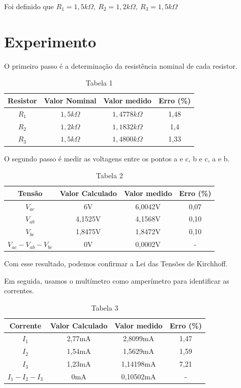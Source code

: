 \documentclass[a4 paper]{article}
\newcommand{\parag}{\hspace{30pt}}
\begin{document}
\noindent Foi definido que $R_1=1,5k\Omega,\ R_2=1,2k\Omega,\ R_3=1,5k\Omega$ 

\newpage\section{Experimento}
\parag O primeiro passo é a determinação da resistência nominal de cada resistor. 

\vspace{5pt}
\begin{table}[h]
\centering
\begin{tabular}{|c|c|c|c|}
\hline
Resistor & Valor Nominal & Valor medido & Erro (\%)\\ \hline
$R_1$ & $1,5k\Omega$ & $1,4778k\Omega$ & 1,48 \\\hline
$R_2$ & $1,2k\Omega$ & $1,1832k\Omega$ & 1,4 \\\hline
$R_3$ & $1,5k\Omega$ & $1,4800k\Omega$ & 1,33 \\\hline
\end{tabular}
\caption*{Tabela 1}
\end{table}
\vspace{15pt}

\parag O segundo passo é medir as voltagens entre os pontos a e c, b e c, a e b. \\
\vspace{5pt}
\begin{table}[h]
\centering
\begin{tabular}{|c|c|c|c|}
\hline
Tensão & Valor Calculado & Valor medido & Erro (\%)\\ \hline
$V_{ac}$ &  6V & 6,0042V & 0,07 \\\hline 
$V_{ab}$ & 4,1525V & 4,1568V & 0,10\\\hline
$V_{bc}$ & 1,8475V & 1,8472V  & 0,10\\\hline
$V_{ac}-V_{ab}-V_{bc}$ & 0V &   0,0002V & - \\\hline
\end{tabular}
\caption*{Tabela 2}
\end{table}

\vspace{15pt}
\parag Com esse resultado, podemos confirmar a Lei das Tensões de Kirchhoff.

\parag Em seguida, usamos o multímetro como amperímetro para identificar as correntes.
\vspace{5pt}
\begin{table}[h]
\centering
\begin{tabular}{|c|c|c|c|}
\hline
Corrente & Valor Calculado & Valor medido & Erro (\%)\\ \hline
$I_1$ & 2,77mA & 2,8099mA & 1,47 \\\hline
$I_2$ & 1,54mA & 1,5629mA & 1,59\\\hline
$I_3$ & 1,23mA & 1,14198mA & 7,21\\\hline
$I_1-I_2-I_3$ & 0mA & 0,10502mA  & - \\\hline
\end{tabular}
\caption*{Tabela 3}
\end{table}
\end{document}
